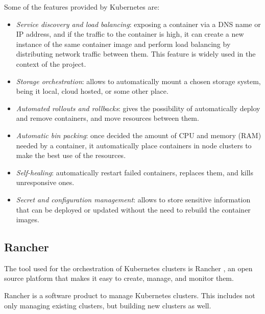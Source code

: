 Some of the features provided by Kubernetes are: 
\begin{itemize}
    \item \emph{Service discovery and load balancing}: exposing a container via a DNS name or IP address, and if the traffic to the container is high, it can create a new instance of the same container image and perform load balancing by distributing network traffic between them. This feature is widely used in the context of the project.
    \item \emph{Storage orchestration}: allows to automatically mount a chosen storage system, being it local, cloud hosted, or some other place.
    \item \emph{Automated rollouts and rollbacks}: gives the possibility of automatically deploy and remove containers, and move resources between them.
    \item \emph{Automatic bin packing}: once decided the amount of CPU and memory (RAM) needed by a container, it automatically place containers in node clusters to make the best use of the resources.
    \item \emph{Self-healing}: automatically restart failed containers, replaces them, and kills unresponsive ones.
    \item \emph{Secret and configuration management}: allows to store sensitive information that can be deployed or updated without the need to rebuild the container images.
\end{itemize}

\subsection*{Rancher}
The tool used for the orchestration of Kubernetes clusters is Rancher \cite{rancher}, an open source platform that makes it easy to create, manage, and monitor them.
\begin{definition}
Rancher is a software product to manage Kubernetes clusters. This includes not only managing existing clusters, but building new clusters as well. \cite{wRancher}
\end{definition}


